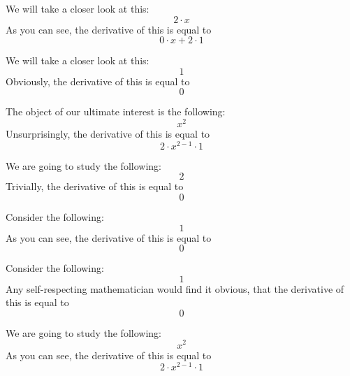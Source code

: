 \documentclass{article}
\begin{document}
We will take a closer look at this:
\begin{equation}
2 \cdot x 
\end{equation}
As you can see, the derivative of this is equal to
\begin{equation}
0 \cdot x + 2 \cdot 1 
\end{equation}

We will take a closer look at this:
\begin{equation}
1 
\end{equation}
Obviously, the derivative of this is equal to
\begin{equation}
0 
\end{equation}

The object of our ultimate interest is the following:
\begin{equation}
x ^{2 } 
\end{equation}
Unsurprisingly, the derivative of this is equal to
\begin{equation}
2 \cdot x ^{2 - 1 } \cdot 1 
\end{equation}

We are going to study the following:
\begin{equation}
2 
\end{equation}
Trivially, the derivative of this is equal to
\begin{equation}
0 
\end{equation}

Consider the following:
\begin{equation}
1 
\end{equation}
As you can see, the derivative of this is equal to
\begin{equation}
0 
\end{equation}

Consider the following:
\begin{equation}
1 
\end{equation}
Any self-respecting mathematician would find it obvious, that the derivative of this is equal to
\begin{equation}
0 
\end{equation}

We are going to study the following:
\begin{equation}
x ^{2 } 
\end{equation}
As you can see, the derivative of this is equal to
\begin{equation}
2 \cdot x ^{2 - 1 } \cdot 1 
\end{equation}
\end{document}
